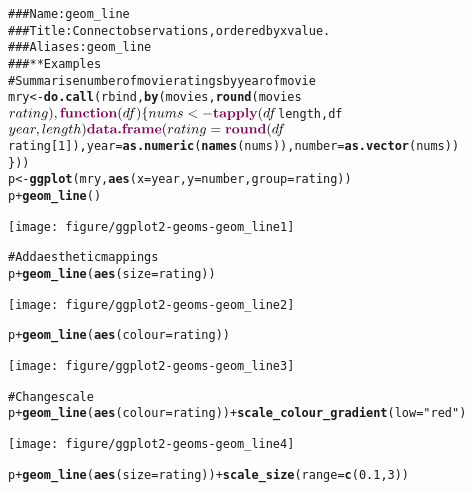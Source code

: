 \documentclass[a4paper,titlepage]{tufte-handout}\usepackage{graphicx, color}
\makeatletter
\def\maxwidth{ %
  \ifdim\Gin@nat@width>\linewidth
    \linewidth
  \else
    \Gin@nat@width
  \fi
}
\newcommand{\hlfunctioncall}[1]{\textcolor[rgb]{0.501960784313725,0,0.329411764705882}{\textbf{#1}}}%
\newcommand{\hlstring}[1]{\textcolor[rgb]{0.6,0.6,1}{#1}}%
\newcommand{\hlcomment}[1]{\textcolor[rgb]{0.180392156862745,0.6,0.341176470588235}{#1}}%
\newenvironment{kframe}{%
 \def\at@end@of@kframe{}%
 \ifinner\ifhmode%
  \def\at@end@of@kframe{\end{minipage}}%
  \begin{minipage}{\columnwidth}%
 \fi\fi%
 \def\FrameCommand##1{\hskip\@totalleftmargin \hskip-\fboxsep
 \colorbox{shadecolor}{##1}\hskip-\fboxsep
     \hskip-\linewidth \hskip-\@totalleftmargin \hskip\columnwidth}%
 \MakeFramed {\advance\hsize-\width
   \@totalleftmargin\z@ \linewidth\hsize
   \@setminipage}}%
 {\par\unskip\endMakeFramed%
 \at@end@of@kframe}
\newenvironment{knitrout}{}{} %
\makeatother
\begin{document}
\begin{knitrout}
\color{fgcolor}\begin{kframe}
\begin{alltt}
\hlcomment{### Name: geom_line}
\hlcomment{### Title: Connect observations, ordered by x value.}
\hlcomment{### Aliases: geom_line}
\hlcomment{### ** Examples}
\hlcomment{# Summarise number of movie ratings by year of movie}
mry <- \hlfunctioncall{do.call}(rbind, \hlfunctioncall{by}(movies, \hlfunctioncall{round}(movies$rating), \hlfunctioncall{function}(df) \{
  nums <- \hlfunctioncall{tapply}(df$length, df$year, length)
  \hlfunctioncall{data.frame}(rating=\hlfunctioncall{round}(df$rating[1]), year = \hlfunctioncall{as.numeric}(\hlfunctioncall{names}(nums)), number=\hlfunctioncall{as.vector}(nums))
\}))
p <- \hlfunctioncall{ggplot}(mry, \hlfunctioncall{aes}(x=year, y=number, group=rating))
p + \hlfunctioncall{geom_line}()
\end{alltt}
\end{kframe}\texttt{[image: figure/ggplot2-geoms-geom\_line1]} \begin{kframe}\begin{alltt}
\hlcomment{# Add aesthetic mappings}
p + \hlfunctioncall{geom_line}(\hlfunctioncall{aes}(size = rating))
\end{alltt}
\end{kframe}\texttt{[image: figure/ggplot2-geoms-geom\_line2]} \begin{kframe}\begin{alltt}
p + \hlfunctioncall{geom_line}(\hlfunctioncall{aes}(colour = rating))
\end{alltt}
\end{kframe}\texttt{[image: figure/ggplot2-geoms-geom\_line3]} \begin{kframe}\begin{alltt}
\hlcomment{# Change scale}
p + \hlfunctioncall{geom_line}(\hlfunctioncall{aes}(colour = rating)) + \hlfunctioncall{scale_colour_gradient}(low=\hlstring{"red"})
\end{alltt}
\end{kframe}\texttt{[image: figure/ggplot2-geoms-geom\_line4]} \begin{kframe}\begin{alltt}
p + \hlfunctioncall{geom_line}(\hlfunctioncall{aes}(size = rating)) + \hlfunctioncall{scale_size}(range = \hlfunctioncall{c}(0.1, 3))
\end{alltt}

\end{kframe}
\end{knitrout}
\end{document}
